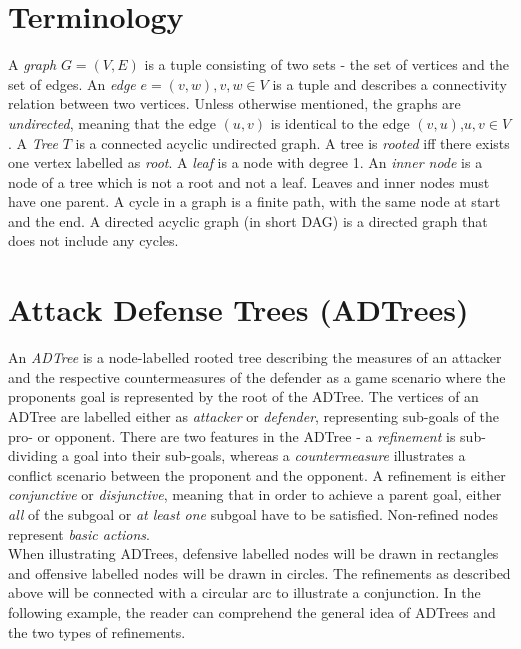 \documentclass[conference]{IEEEtran}
\begin{document}
\section{Terminology}
A \textit{graph} $G=(V,E)$ is a tuple consisting of two sets - the set of vertices and the set of edges. An \textit{edge} $e = (v,w), v,w \in V$ is a tuple and describes a connectivity relation between two vertices. Unless otherwise mentioned, the graphs are \textit{undirected}, meaning that the edge $(u,v)$ is identical to the edge $(v,u)$,$u,v\in V$. A \textit{Tree} $T$ is a connected acyclic undirected graph. 
A tree is \textit{rooted} iff there exists one vertex labelled as \textit{root}.\cite[p.42]{GD} A \textit{leaf} is a node with degree 1. An \textit{inner node} is a node of a tree which is not a root and not a leaf. Leaves and inner nodes must have one parent. \cite[p.34]{Cormen} A cycle in a graph is a finite path, with the same node at start and the end. A directed acyclic graph (in short DAG) is a directed graph that does not include any cycles.
\section{Attack Defense Trees (ADTrees)}
An \textit{ADTree} is a node-labelled rooted tree describing the measures of an attacker and the respective countermeasures of the defender as a game scenario where the proponents goal is represented by the root of the ADTree. The vertices of an ADTree are labelled either as \textit{attacker} or \textit{defender}, representing sub-goals of the pro- or opponent. There are two features in the ADTree - a \textit{refinement} is sub-dividing a goal into their sub-goals, whereas a \textit{countermeasure} illustrates a conflict scenario between the proponent and the opponent. A refinement is either \textit{conjunctive} or \textit{disjunctive}, meaning that in order to achieve a parent goal, either \textit{all} of the subgoal or \textit{at least one} subgoal have to be satisfied. Non-refined nodes represent \textit{basic actions}.\\
When illustrating ADTrees, defensive labelled nodes will be drawn in rectangles and offensive labelled nodes will be drawn in circles. The refinements as described above will be connected with a circular arc to illustrate a conjunction. In the following example, the reader can comprehend the general idea of ADTrees and the two types of refinements.
\end{document}
